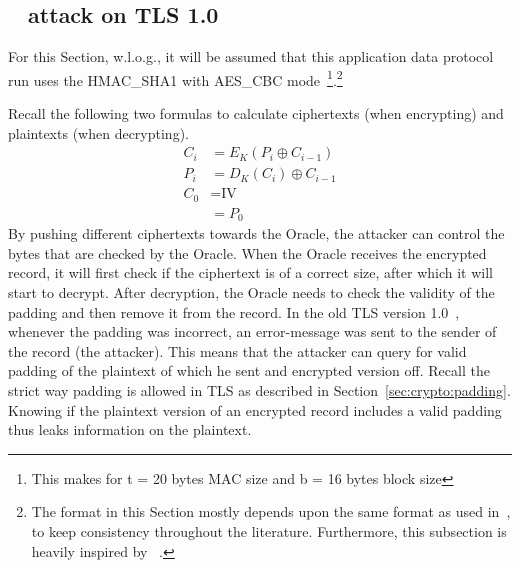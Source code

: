 \documentclass[10pt,conference,a4paper]{IEEEtran}
\begin{document}
\subsection{~\citeauthor{vaudenay2002security} attack on TLS 1.0}
\label{sec:paddingoracle:padding}
For this Section, w.l.o.g., it will be assumed that this application data protocol run uses the HMAC\_SHA1 with AES\_CBC mode~\footnote{This makes for t = 20 bytes MAC size and b = 16 bytes block size}.\footnote{The format in this Section mostly depends upon the same format as used in~\cite{alfardan2013lucky}, to keep consistency throughout the literature. Furthermore, this subsection is heavily inspired by ~\cite{alfardan2013lucky,vaudenay2002security}.}

Recall the following two formulas to calculate ciphertexts (when  encrypting) and plaintexts (when decrypting).
\[
\begin{split}
C_i &= E_K(P_i \oplus C_{i-1}) \\
P_i &= D_K(C_i) \oplus C_{i-1} \\
C_0 &= \text{IV} \\
&= P_0
\end{split}
\]
By pushing different ciphertexts towards the Oracle, the attacker can control the bytes that are checked by the Oracle. When the Oracle receives the encrypted record, it will first check if the ciphertext is of a correct size, after which it will start to decrypt. After decryption, the Oracle needs to check the validity of the padding and then remove it from the record. In the old TLS version 1.0~\cite{dierks1999rfc}, whenever the padding was incorrect, an error-message was sent to the sender of the record (the attacker). This means that the attacker can query for valid padding of the plaintext of which he sent and encrypted version off. Recall the strict way padding is allowed in TLS as described in Section~\ref{sec:crypto:padding}. Knowing if the plaintext version of an encrypted record includes a valid padding thus leaks information on the plaintext.
\end{document}
